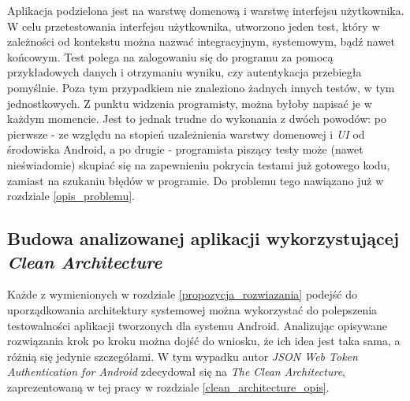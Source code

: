 Aplikacja podzielona jest na warstwę domenową i warstwę interfejsu użytkownika. W celu przetestowania interfejsu użytkownika, utworzono jeden test, który w zależności od kontekstu można nazwać integracyjnym, systemowym, bądź nawet końcowym. Test polega na zalogowaniu się do programu za pomocą przykładowych danych i otrzymaniu wyniku, czy autentykacja przebiegła pomyślnie. Poza tym przypadkiem nie znaleziono żadnych innych testów, w tym jednostkowych. Z punktu widzenia programisty, można byłoby napisać je w każdym momencie. Jest to jednak trudne do wykonania z dwóch powodów: po pierwsze - ze względu na stopień uzależnienia warstwy domenowej i \textit{UI} od środowiska Android, a po drugie - programista piszący testy może (nawet nieświadomie) skupiać się na zapewnieniu pokrycia testami już gotowego kodu, zamiast na szukaniu błędów w programie. Do problemu tego nawiązano już w rozdziale \ref{opis_problemu}.

\subsection{Budowa analizowanej aplikacji wykorzystującej \textit{Clean Architecture}}
Każde z wymienionych w rozdziale \ref{propozycja_rozwiazania} podejść do uporządkowania architektury systemowej można wykorzystać do polepszenia testowalności aplikacji tworzonych dla systemu Android. Analizując opisywane rozwiązania krok po kroku można dojść do wniosku, że ich idea jest taka sama, a różnią się jedynie szczegółami. W tym wypadku autor \textit{JSON Web Token Authentication for Android} zdecydował się na \textit{The Clean Architecture}, zaprezentowaną w tej pracy w rozdziale \ref{clean_architecture_opis}.

